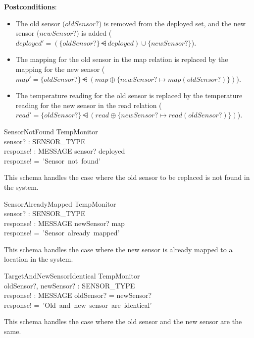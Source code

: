 \documentclass[12pt]{article}
\begin{document}
\begin{spacing}{1.5}
	\textbf{Postconditions}:
	\begin{itemize}
		\item The old sensor ($oldSensor?$) is removed from the deployed set, and the new sensor ($newSensor?$) is added ($deployed' = (\{oldSensor?\} \dsub deployed) \cup \{newSensor?\}$).
		\item The mapping for the old sensor in the map relation is replaced by the mapping for the new sensor ($map' = \{oldSensor?\} \dsub (map \oplus \{newSensor? \mapsto map(oldSensor?)\})$).
		\item The temperature reading for the old sensor is replaced by the temperature reading for the new sensor in the read relation ($read' = \{oldSensor?\} \dsub (read \oplus \{newSensor? \mapsto read(oldSensor?)\})$).
	\end{itemize}
	
	\begin{schema}{SensorNotFound}
		\Xi TempMonitor \\
		sensor? : SENSOR\_TYPE \\
		response! : MESSAGE
		\where
		sensor? \notin deployed \\
		response! =~'Sensor~not~found'
	\end{schema}
	
	This schema handles the case where the old sensor to be replaced is not found in the system.
	
	\begin{schema}{SensorAlreadyMapped}
		\Xi TempMonitor \\
		sensor? : SENSOR\_TYPE \\
		response! : MESSAGE
		\where
		newSensor? \in \dom map \\
		response! =~'Sensor~already~mapped'
	\end{schema}
	
	This schema handles the case where the new sensor is already mapped to a location in the system.
	    
	\begin{schema}{TargetAndNewSensorIdentical}
		\Xi TempMonitor \\
		oldSensor?, newSensor? : SENSOR\_TYPE \\
		response! : MESSAGE
		\where
		oldSensor? = newSensor? \\
		response! =~'Old~and~new~sensor~are~identical'
	\end{schema}
	
	This schema handles the case where the old sensor and the new sensor are the same.
	    

\end{spacing}
\end{document}
